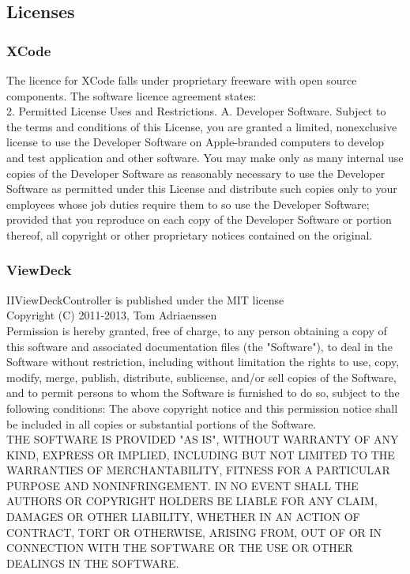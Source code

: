 \documentclass[a4wide, 10pt]{article}
\begin{document}
\subsection{Licenses}

\subsubsection{XCode}

The licence for XCode falls under proprietary freeware with open source components. The software licence agreement states:\\
2. Permitted License Uses and Restrictions.
A. Developer Software. Subject to the terms and conditions of this License, you are granted a limited, nonexclusive
license to use the Developer Software on Apple-branded computers to develop and test application
and other software. You may make only as many internal use copies of the Developer Software as
reasonably necessary to use the Developer Software as permitted under this License and distribute such
copies only to your employees whose job duties require them to so use the Developer Software; provided
that you reproduce on each copy of the Developer Software or portion thereof, all copyright or other
proprietary notices contained on the original.

\subsubsection{ViewDeck}
IIViewDeckController is published under the MIT license\\

Copyright (C) 2011-2013, Tom Adriaenssen\\
Permission is hereby granted, free of charge, to any person obtaining a copy of this software and associated documentation files (the "Software"), to deal in the Software without restriction, including without limitation the rights to use, copy, modify, merge, publish, distribute, sublicense, and/or sell copies of the Software, and to permit persons to whom the Software is furnished to do so, subject to the following conditions:
The above copyright notice and this permission notice shall be included in all copies or substantial portions of the Software.\\
THE SOFTWARE IS PROVIDED "AS IS", WITHOUT WARRANTY OF ANY KIND, EXPRESS OR IMPLIED, INCLUDING BUT NOT LIMITED TO THE WARRANTIES OF MERCHANTABILITY, FITNESS FOR A PARTICULAR PURPOSE AND NONINFRINGEMENT. IN NO EVENT SHALL THE AUTHORS OR COPYRIGHT HOLDERS BE LIABLE FOR ANY CLAIM, DAMAGES OR OTHER LIABILITY, WHETHER IN AN ACTION OF CONTRACT, TORT OR OTHERWISE, ARISING FROM, OUT OF OR IN CONNECTION WITH THE SOFTWARE OR THE USE OR OTHER DEALINGS IN THE SOFTWARE.
\end{document}
